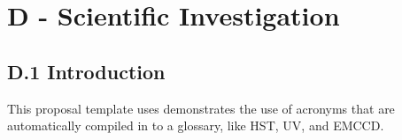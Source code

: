 \documentclass[12pt,journal]{IEEEtran}
\begin{document}
\twocolumn
\setcounter{page}{1}


\section{D - Scientific Investigation}\label{sec:D}
\par{}%



\subsection{D.1 Introduction}
This proposal template uses demonstrates the use of acronyms that are automatically compiled in to a glossary, like \gls{HST}, \gls{UV}, and \gls{EMCCD}.
\end{document}
